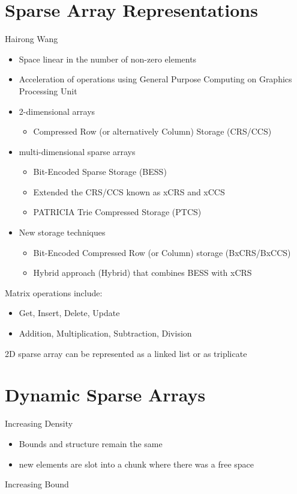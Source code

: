 \section{Sparse Array Representations}
Hairong Wang \cite{wang:2014sar}
\begin{itemize}
	\item Space linear in the number of non-zero elements
	\item Acceleration of operations using General Purpose Computing on Graphics Processing Unit
	\item 2-dimensional arrays
	\begin{itemize}
		\item Compressed Row (or alternatively Column) Storage (CRS/CCS)
	\end{itemize}
	\item multi-dimensional sparse arrays
	\begin{itemize}
		\item Bit-Encoded Sparse Storage (BESS) 
		\item Extended the CRS/CCS known as xCRS and xCCS
		\item PATRICIA Trie Compressed Storage (PTCS)
	\end{itemize}
	\item New storage techniques
	\begin{itemize}
		\item Bit-Encoded Compressed Row (or Column) storage (BxCRS/BxCCS)
		\item Hybrid approach (Hybrid) that combines BESS with xCRS
	\end{itemize}
\end{itemize}
Matrix operations include: 
\begin{itemize}
	\item Get, Insert, Delete, Update
	\item Addition, Multiplication, Subtraction, Division
\end{itemize}
2D sparse array can be represented as a linked list or as triplicate 


\section{Dynamic Sparse Arrays}
Increasing Density
\begin{itemize}
	\item Bounds and structure remain the same
	\item new elements are slot into a chunk where there was a free space
\end{itemize}
Increasing Bound



